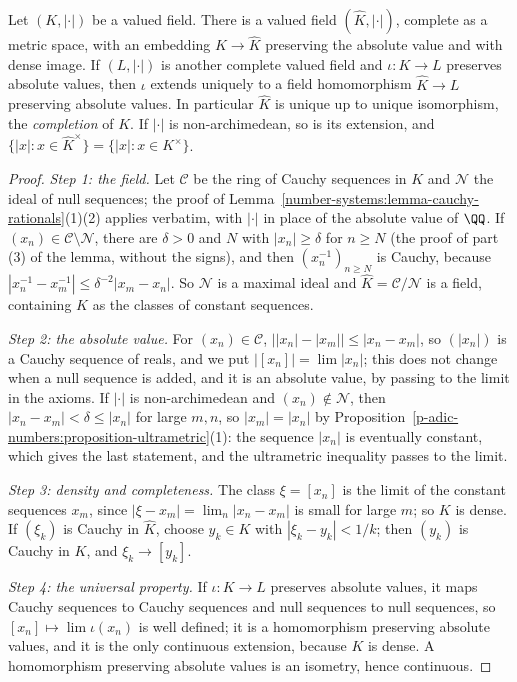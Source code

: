 \begin{theorem}\label{p-adic-numbers:theorem-completion}
Let $(K, |\cdot|)$ be a valued field. There is a valued field $(\hat K, |\cdot|)$, complete as a metric space, with an embedding $K \to \hat K$ preserving the absolute value and with dense image. If
$(L, |\cdot|)$ is another complete valued field and $\iota \colon K \to L$ preserves absolute values, then $\iota$ extends uniquely to a field homomorphism $\hat K \to L$ preserving absolute values.
In particular $\hat K$ is unique up to unique isomorphism, the \emph{completion} of $K$. If $|\cdot|$ is non-archimedean, so is its extension, and $\{|x| : x \in \hat K^\times\} = \{|x| : x \in K^\times\}$.
\end{theorem}

\begin{proof}
\emph{Step 1: the field.} Let $\mathcal{C}$ be the ring of Cauchy sequences in $K$ and $\mathcal{N}$ the ideal of null sequences; the proof of
Lemma~\ref{number-systems:lemma-cauchy-rationals}(1)(2) applies verbatim, with $|\cdot|$ in place of the absolute value of $\QQ$. If $(x_n) \in \mathcal{C} \setminus \mathcal{N}$, there are $\delta > 0$
and $N$ with $|x_n| \geq \delta$ for $n \geq N$ (the proof of part (3) of the lemma, without the signs), and then $(x_n^{-1})_{n \geq N}$ is Cauchy, because
$|x_n^{-1} - x_m^{-1}| \leq \delta^{-2}|x_m - x_n|$. So $\mathcal{N}$ is a maximal ideal and $\hat K = \mathcal{C}/\mathcal{N}$ is a field, containing $K$ as the classes of constant sequences.

\emph{Step 2: the absolute value.} For $(x_n) \in \mathcal{C}$, $\bigl||x_n| - |x_m|\bigr| \leq |x_n - x_m|$, so $(|x_n|)$ is a Cauchy sequence of reals, and we put $|[x_n]| = \lim|x_n|$; this does not
change when a null sequence is added, and it is an absolute value, by passing to the limit in the axioms. If $|\cdot|$ is non-archimedean and $(x_n) \notin \mathcal{N}$, then
$|x_n - x_m| < \delta \leq |x_n|$ for large $m, n$, so $|x_m| = |x_n|$ by Proposition~\ref{p-adic-numbers:proposition-ultrametric}(1): the sequence $|x_n|$ is eventually constant, which gives the
last statement, and the ultrametric inequality passes to the limit.

\emph{Step 3: density and completeness.} The class $\xi = [x_n]$ is the limit of the constant sequences $x_m$, since $|\xi - x_m| = \lim_n|x_n - x_m|$ is small for large $m$; so $K$ is dense. If $(\xi_k)$
is Cauchy in $\hat K$, choose $y_k \in K$ with $|\xi_k - y_k| < 1/k$; then $(y_k)$ is Cauchy in $K$, and $\xi_k \to [y_k]$.

\emph{Step 4: the universal property.} If $\iota \colon K \to L$ preserves absolute values, it maps Cauchy sequences to Cauchy sequences and null sequences to null sequences, so
$[x_n] \mapsto \lim\iota(x_n)$ is well defined; it is a homomorphism preserving absolute values, and it is the only continuous extension, because $K$ is dense. A homomorphism preserving absolute
values is an isometry, hence continuous.
\end{proof}

